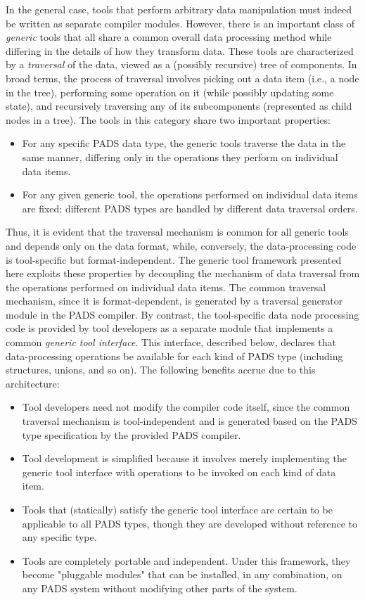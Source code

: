 In the general case, tools that perform arbitrary data manipulation must indeed be written as separate compiler modules. However, there is an important class of \emph{generic} tools that all share a common overall data processing method while differing in the details of how they transform data. These tools are characterized by a \emph{traversal} of the data, viewed as a (possibly recursive) tree of components. In broad terms, the process of traversal involves picking out a data item (i.e., a node in the tree), performing some operation on it (while possibly updating some state), and recursively traversing any of its subcomponents (represented as child nodes in a tree). The tools in this category share two important properties:
\begin{itemize}
\item For any specific PADS data type, the generic tools traverse the data in the same manner, differing only in the operations they perform on individual data items.
\item For any given generic tool, the operations performed on individual data items are fixed; different PADS types are handled by different data traversal orders.
\end{itemize}

Thus, it is evident that the traversal mechanism is common for all generic tools and depends only on the data format, while, conversely, the data-processing code is tool-specific but format-independent. The generic tool framework presented here exploits these properties by decoupling the mechanism of data traversal from the operations performed on individual data items. The common traversal mechanism, since it is format-dependent, is generated by a traversal generator module in the PADS compiler. By contrast, the tool-specific data node processing code is provided by tool developers as a separate module that implements a common \emph{generic tool interface}. This interface, described below, declares that data-processing operations be available for each kind of PADS type (including structures, unions, and so on). The following benefits accrue due to this architecture:
\begin{itemize}
\item Tool developers need not modify the compiler code itself, since the common traversal mechanism is tool-independent and is generated based on the PADS type specification by the provided PADS compiler.
\item Tool development is simplified because it involves merely implementing the generic tool interface with operations to be invoked on each kind of data item.
\item Tools that (statically) satisfy the generic tool interface are certain to be applicable to all PADS types, though they are developed without reference to any specific type.
\item Tools are completely portable and independent. Under this framework, they become "pluggable modules" that can be installed, in any combination, on any PADS system without modifying other parts of the system.
\end{itemize}


